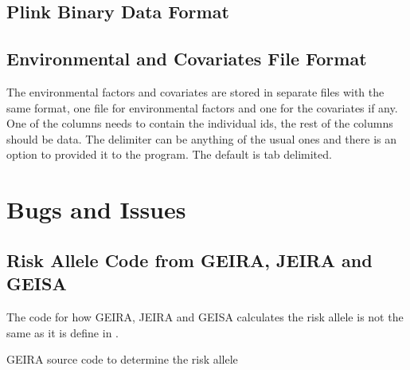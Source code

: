 \documentclass[10pt,a4paper]{report}
\begin{document}
\begin{appendices}
\section{Plink Binary Data Format}

\section{Environmental and Covariates File Format}
The environmental factors and covariates are stored in separate files with the same format, one file for environmental factors and one for the covariates if any. One of the columns needs to contain the individual ids, the rest of the columns should be data. The delimiter can be anything of the usual ones and there is an option to provided it to the program. The default is tab delimited.

\chapter{Bugs and Issues}

\section{Risk Allele Code from GEIRA, JEIRA and GEISA}
\label{geira_jeira_risk_allele}
The code for how GEIRA, JEIRA and GEISA calculates the risk allele is not the same as it is define in \cite{geira, uvehag_master_thesis}.

\begin{algorithm}
\DontPrintSemicolon
{}
\BlankLine \BlankLine


\BlankLine \BlankLine


\caption{GEIRA source code to determine the risk allele}
\label{alg:geira_risk_allele}
\end{algorithm}

\begin{algorithm}
\DontPrintSemicolon
{}
\BlankLine \BlankLine


\end{algorithm}
\end{appendices}
\end{document}
